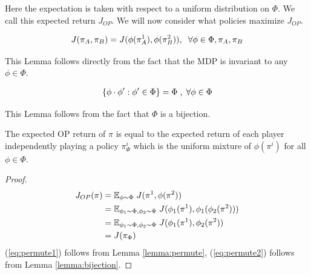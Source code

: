 Here the expectation is taken with respect to a uniform distribution on $\Phi$. We call this expected return $J_{OP}$. We will now consider what policies maximize $J_{OP}$.

\begin{lemma}
\begin{align*}
    J(\pi_A, \pi_B) = J(\phi(\pi_A^1), \phi(\pi_B^2)), \hspace{2mm} \forall \phi\in \Phi, \pi_A, \pi_B
\end{align*}
\label{lemma:permute}
\end{lemma}
\vspace{-3mm}
This Lemma follows directly from the fact that the MDP is invariant to any $\phi \in \Phi$.

\begin{lemma}
\begin{align*}
    \{\phi \cdot \phi' : \phi' \in \Phi \} = \Phi \hspace{1mm},\hspace{1mm} \forall \phi \in \Phi
\end{align*}
\label{lemma:bijection}
\end{lemma}
\vspace{-3mm}
This Lemma follows from the fact that $\Phi$ is a bijection.

\begin{prop}
The expected OP return of $\pi$ is equal to the expected return of each player independently playing a policy $\pi_\Phi^i$ which is the uniform mixture of $\phi(\pi^i)$ for all $\phi \in \Phi$.
\end{prop}

\begin{proof}
\begin{align}
    J_{OP}(\pi) & = \mathbb{E}_{\phi \sim \Phi}  \hspace{1mm} { J(\pi^1,  \phi(\pi^2)) } \\
    & = \mathbb{E}_{\phi_1 \sim \Phi, \phi_2 \sim \Phi} \hspace{1mm} { J(\phi_1(\pi^1), \phi_1(\phi_2(\pi^2))) }  \label{eq:permute1} \\
    & = \mathbb{E}_{\phi_1 \sim \Phi, \phi_2 \sim \Phi} \hspace{1mm} { J(\phi_1(\pi^1), \phi_2(\pi^2)) } \label{eq:permute2}\\
    & = J(\pi_{\Phi})
\end{align}
 (\ref{eq:permute1}) follows from Lemma \ref{lemma:permute}, (\ref{eq:permute2}) follows from Lemma \ref{lemma:bijection}.

\end{proof}

